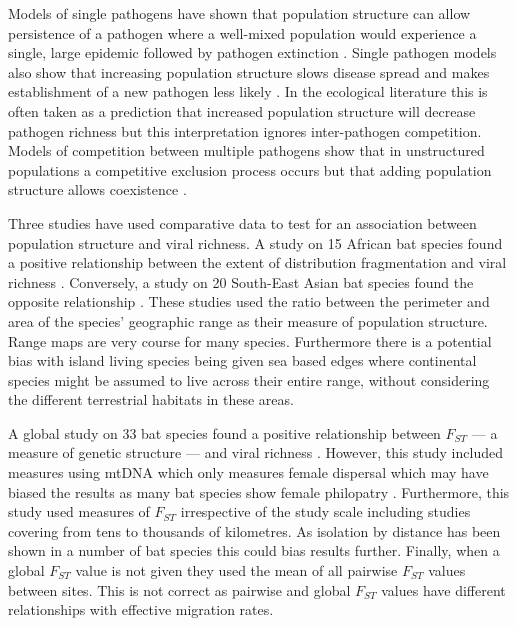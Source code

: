 Models of single pathogens have shown that population structure can allow persistence of a pathogen where a well-mixed population would experience a single, large epidemic followed by pathogen extinction \cite{blackwood2013resolving, pons2014insights, plowright2011urban}.
Single pathogen models also show that increasing population structure slows disease spread and makes establishment of a new pathogen less likely \cite{colizza2007invasion, vespignani2008reaction}.
In the ecological literature this is often taken as a prediction that increased population structure will decrease pathogen richness \cite{nunn2003comparative, morand2000wormy, poulin2014parasite, poulin2000diversity, altizer2003social} but this interpretation ignores inter-pathogen competition.
Models of competition between multiple pathogens show that in unstructured populations a competitive exclusion process occurs but that adding population structure allows coexistence \cite{qiu2013vector, allen2004sis, nunes2006localized}.


Three studies have used comparative data to test for an association between population structure and viral richness.
A study on 15 African bat species found a positive relationship between the extent of distribution fragmentation and viral richness \cite{maganga2014bat}.
Conversely, a study on 20 South-East Asian bat species found the opposite relationship \cite{gay2014parasite}. 
These studies used the ratio between the perimeter and area of the species' geographic range as their measure of population structure.
Range maps are very course for many species.
Furthermore there is a potential bias with island living species being given sea based edges where continental species might be assumed to live across their entire range, without considering the different terrestrial habitats in these areas.

A global study on 33 bat species found a positive relationship between $F_{ST}$ --- a measure of genetic structure --- and viral richness \cite{turmelle2009correlates}. 
However, this study included measures using mtDNA which only measures female dispersal which may have biased the results as many bat species show female philopatry \cite{kerth2002extreme, hulva2010mechanisms}.
Furthermore, this study used measures of $F_{ST}$ irrespective of the study scale including studies covering from tens \cite{mccracken1981social} to thousands \cite{petit1999male} of kilometres.
As isolation by distance has been shown in a number of bat species \cite{burland1999population, hulva2010mechanisms, o2015genetic, vonhof2015range} this could bias results further.
Finally, when a global $F_{ST}$ value is not given they used the mean of all pairwise $F_{ST}$ values between sites.
This is not correct as pairwise and global $F_{ST}$ values have different relationships with effective migration rates. 

